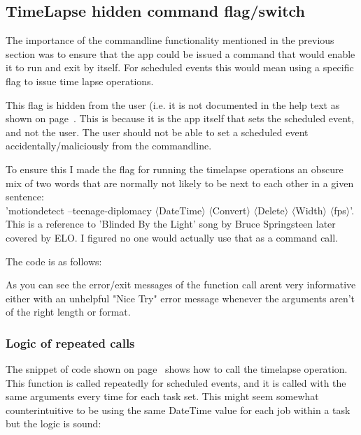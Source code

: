 \documentclass[11pt]{article} %
\begin{document}
\subsection{TimeLapse hidden command flag/switch}

The importance of the commandline functionality mentioned in the previous section was to ensure that the app could be issued a command that would enable it to run and exit by itself. For scheduled events this would mean using a specific flag to issue time lapse operations.

This flag is hidden from the user (i.e. it is not documented in the help text as shown on page~\pageref{frame:help}. This is because it is the app itself that sets the scheduled event, and not the user. The user should not be able to set a scheduled event accidentally/maliciously from the commandline.

To ensure this I made the flag for running the timelapse operations an obscure mix of two words that are normally not likely to be next to each other in a given sentence:\\
'motiondetect --teenage-diplomacy \(\langle\)DateTime\(\rangle\) \(\langle\)Convert\(\rangle\) \(\langle\)Delete\(\rangle\) \(\langle\)Width\(\rangle\) \(\langle\)fps\(\rangle\)'. This is a reference to 'Blinded By the Light' song by Bruce Springsteen later covered by ELO. I figured no one would actually use that as a command call.

The code is as follows:
\begin{frame}[fragile]

\label{code:secret}
\end{frame}

As you can see  the error/exit messages of the function call arent very informative either with an unhelpful "Nice Try" error message whenever the arguments aren't of the right length or format. 

\subsubsection{Logic of repeated calls}

The snippet of code shown on page~\pageref{code:secret} shows how to call the timelapse operation. This function is called repeatedly for scheduled events, and it is called with the same arguments every time for each task set. This might seem somewhat counterintuitive to be using the same DateTime value for each job within a task but the logic is sound:
\end{document}
